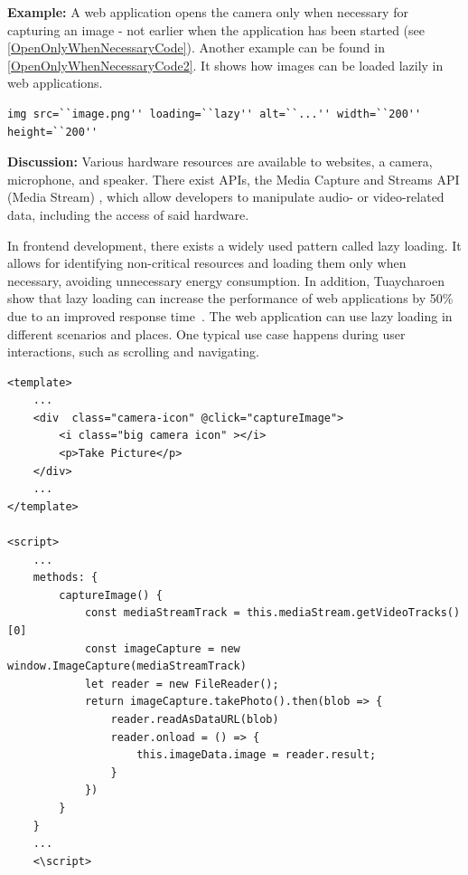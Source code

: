 \textbf{Example:} A web application opens the camera only when necessary for capturing an image - not earlier when the application has been started (see \autoref{OpenOnlyWhenNecessaryCode}). Another example can be found in \autoref{OpenOnlyWhenNecessaryCode2}. It shows how images can be loaded lazily in web applications.

\begin{minipage}{\linewidth}
    \begin{lstlisting}[caption={Code snippet showing the usage of the loading attribute to lazy-load images \cite{lazy-loading-code-example}}, label={OpenOnlyWhenNecessaryCode2}]
img src=``image.png'' loading=``lazy'' alt=``...'' width=``200'' height=``200''
\end{lstlisting}
\end{minipage}

\textbf{Discussion:} Various hardware resources are available to websites, \eg a camera, microphone, and speaker. There exist APIs, \eg the Media Capture and Streams API (Media Stream) \cite{media-streams-api}, which allow developers to manipulate audio- or video-related data, including the access of said hardware.

In frontend development, there exists a widely used pattern called lazy loading. It allows for identifying non-critical resources and loading them only when necessary, avoiding unnecessary energy consumption. In addition, Tuaycharoen \etal show that lazy loading can increase the performance of web applications by 50\% due to an improved response time~\cite{Tuaycharoen2018}. The web application can use lazy loading in different scenarios and places. One typical use case happens during user interactions, such as scrolling and navigating.

\begin{minipage}{0.95\linewidth}
    \begin{lstlisting}[caption={Accessing the camera only when actually capturing the image - not earlier \cite{github-vue-cam-demo}}, label={OpenOnlyWhenNecessaryCode}]
<template>
    ...
    <div  class="camera-icon" @click="captureImage">
        <i class="big camera icon" ></i>
        <p>Take Picture</p>
    </div>
    ...
</template>

<script>
    ...
    methods: {
        captureImage() {
            const mediaStreamTrack = this.mediaStream.getVideoTracks()[0]
            const imageCapture = new window.ImageCapture(mediaStreamTrack)
            let reader = new FileReader();
            return imageCapture.takePhoto().then(blob => {
                reader.readAsDataURL(blob)
                reader.onload = () => {
                    this.imageData.image = reader.result;
                }
            })  
        }
    }
    ...
    <\script>
    \end{lstlisting}
\end{minipage}

